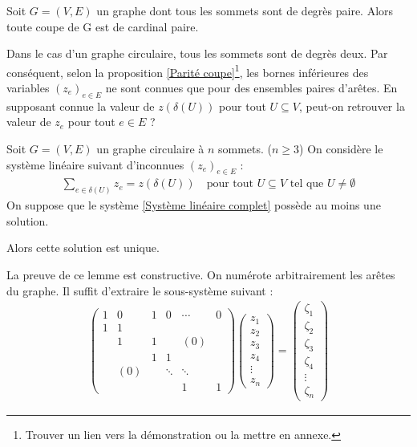 \begin{prop}\label{Parité coupe}
Soit $G=(V,E)$ un graphe dont tous les sommets sont de degrès paire. Alors toute coupe de G est de cardinal paire.
\end{prop}

Dans le cas d'un graphe circulaire, tous les sommets sont de degrès deux. Par conséquent, selon la proposition \ref{Parité coupe}\footnote{Trouver un lien vers la démonstration ou la mettre en annexe.}, les bornes inférieures des variables $(z_e)_{e \in E}$ ne sont connues que pour des ensembles paires d'arêtes. En supposant connue la valeur de $z(\delta(U))$ pour tout $U \subseteq V$, peut-on retrouver la valeur de $z_e$ pour tout $e \in E$ ?

\begin{lem}\label{Changement de base}
Soit $G=(V,E)$ un graphe circulaire à $n$ sommets. ($n \ge 3$)
On considère le système linéaire suivant d'inconnues $(z_e)_{e \in E}$ :
\begin{gather}\label{Système linéaire complet}
  \sum_{e \in \delta(U)}z_e = z(\delta(U)) \quad \mbox{pour tout } U \subseteq V \mbox{ tel que } U \ne \emptyset
\end{gather}
On suppose que le système \ref{Système linéaire complet} possède au moins une solution.

Alors cette solution est unique.
\end{lem}

La preuve de ce lemme est constructive. On numérote arbitrairement les arêtes du graphe. Il suffit d'extraire le sous-système suivant :
\begin{gather}\label{Système linéaire extrait}
  \left(
  \begin{array}{cccccc}
    1 & 0   & 1 & 0      & \cdots & 0 \\
    1 & 1   &   &        &        &   \\
      & 1   & 1 &        & (0)    &   \\
      &     & 1 & 1      &        &   \\
      & (0) &   & \ddots & \ddots &   \\
      &     &   &        & 1      & 1
  \end{array} \right)
  \left(
  \begin{array}{c}
    z_1 \\
    z_2 \\
    z_3 \\
    z_4 \\
    \vdots \\
    z_n
  \end{array} \right)
  =
  \left(
  \begin{array}{c}
    \zeta_1 \\
    \zeta_2 \\
    \zeta_3 \\
    \zeta_4 \\
    \vdots  \\
    \zeta_n
  \end{array} \right)
\end{gather}

